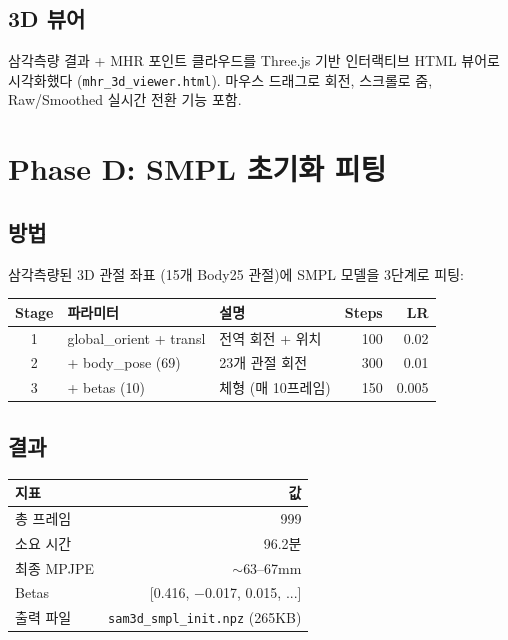 \documentclass[11pt, a4paper]{article}
\begin{document}
\subsection{3D 뷰어}

삼각측량 결과 + MHR 포인트 클라우드를 Three.js 기반 인터랙티브 HTML 뷰어로 시각화했다 (\texttt{mhr\_3d\_viewer.html}). 마우스 드래그로 회전, 스크롤로 줌, Raw/Smoothed 실시간 전환 기능 포함.

\section{Phase D: SMPL 초기화 피팅}

\subsection{방법}

삼각측량된 3D 관절 좌표 (15개 Body25 관절)에 SMPL 모델을 3단계로 피팅:

\begin{center}
\begin{tabular}{c l l r r}
\toprule
\textbf{Stage} & \textbf{파라미터} & \textbf{설명} & \textbf{Steps} & \textbf{LR} \\
\midrule
1 & global\_orient + transl & 전역 회전 + 위치 & 100 & 0.02 \\
2 & + body\_pose (69) & 23개 관절 회전 & 300 & 0.01 \\
3 & + betas (10) & 체형 (매 10프레임) & 150 & 0.005 \\
\bottomrule
\end{tabular}
\end{center}

\subsection{결과}

\begin{center}
\begin{tabular}{l r}
\toprule
\textbf{지표} & \textbf{값} \\
\midrule
총 프레임 & 999 \\
소요 시간 & 96.2분 \\
최종 MPJPE & $\sim$63--67mm \\
Betas & [0.416, $-$0.017, 0.015, ...] \\
출력 파일 & \texttt{sam3d\_smpl\_init.npz} (265KB) \\
\bottomrule
\end{tabular}
\end{center}
\end{document}
